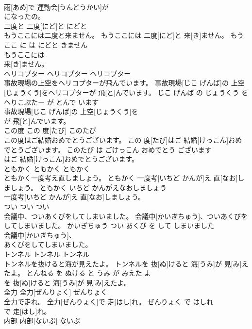 \documentclass[8pt]{extreport}
\begin{document}
\begin{CJK}{UTF8}{min}
\\	雨[あめ]で 運動会[うんどうかい]が
\\	になったの。			
\\	二度と	二度[にど]と	にどと	
\\	もうここには二度と来ません。	もうここには 二度[にど]と 来[き]ません。	もう ここ に は にどと きません	
\\	もうここには
\\	来[き]ません。			
\\	ヘリコプター	ヘリコプター	ヘリコプター	
\\	事故現場の上空をヘリコプターが飛んでいます。	事故現場[じこ げんば]の 上空[じょうくう]をヘリコプターが 飛[と]んでいます。	じこ げんば の じょうくう を へりこぷたー が とんで います	
\\	事故現場[じこ げんば]の 上空[じょうくう]を
\\	が 飛[と]んでいます。			
\\	この度	この 度[たび]	このたび	
\\	この度はご結婚おめでとうございます。	この 度[たび]はご 結婚[けっこん]おめでとうございます。	このたび は ごけっこん おめでとう ございます	
\\	はご 結婚[けっこん]おめでとうございます。			
\\	ともかく	ともかく	ともかく	
\\	ともかく一度考え直しましょう。	ともかく 一度考[いちど かんが]え 直[なお]しましょう。	ともかく いちど かんがえなおしましょう	
\\	一度考[いちど かんが]え 直[なお]しましょう。			
\\	つい	つい	つい	
\\	会議中、ついあくびをしてしまいました。	会議中[かいぎちゅう]、ついあくびをしてしまいました。	かいぎちゅう つい あくび を して しまいました	
\\	会議中[かいぎちゅう]、
\\	あくびをしてしまいました。			
\\	トンネル	トンネル	トンネル	
\\	トンネルを抜けると海が見えたよ。	トンネルを 抜[ぬ]けると 海[うみ]が 見[み]えたよ。	とんねる を ぬける と うみ が みえた よ	
\\	を 抜[ぬ]けると 海[うみ]が 見[み]えたよ。			
\\	全力	全力[ぜんりょく]	ぜんりょく	
\\	全力で走れ。	全力[ぜんりょく]で 走[はし]れ。	ぜんりょく で はしれ	
\\	で 走[はし]れ。			
\\	内部	内部[ないぶ]	ないぶ	

\end{CJK}
\end{document}
